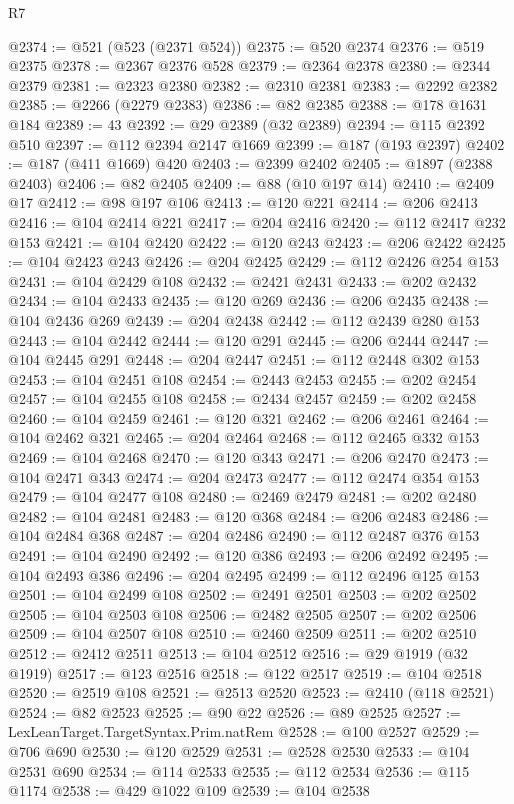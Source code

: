 \begin{lexlean}{R7}
\begin{coremodule}
@2374 := @521 (@523 (@2371 @524))
@2375 := @520 @2374
@2376 := @519 @2375
@2378 := @2367 @2376 @528
@2379 := @2364 @2378
@2380 := @2344 @2379
@2381 := @2323 @2380
@2382 := @2310 @2381
@2383 := @2292 @2382
@2385 := @2266 (@2279 @2383)
@2386 := @82 @2385
@2388 := @178 @1631 @184
@2389 := 43
@2392 := @29 @2389 (@32 @2389)
@2394 := @115 @2392 @510
@2397 := @112 @2394 @2147 @1669
@2399 := @187 (@193 @2397)
@2402 := @187 (@411 @1669) @420
@2403 := @2399 @2402
@2405 := @1897 (@2388 @2403)
@2406 := @82 @2405
@2409 := @88 (@10 @197 @14)
@2410 := @2409 @17
@2412 := @98 @197 @106
@2413 := @120 @221
@2414 := @206 @2413
@2416 := @104 @2414 @221
@2417 := @204 @2416
@2420 := @112 @2417 @232 @153
@2421 := @104 @2420
@2422 := @120 @243
@2423 := @206 @2422
@2425 := @104 @2423 @243
@2426 := @204 @2425
@2429 := @112 @2426 @254 @153
@2431 := @104 @2429 @108
@2432 := @2421 @2431
@2433 := @202 @2432
@2434 := @104 @2433
@2435 := @120 @269
@2436 := @206 @2435
@2438 := @104 @2436 @269
@2439 := @204 @2438
@2442 := @112 @2439 @280 @153
@2443 := @104 @2442
@2444 := @120 @291
@2445 := @206 @2444
@2447 := @104 @2445 @291
@2448 := @204 @2447
@2451 := @112 @2448 @302 @153
@2453 := @104 @2451 @108
@2454 := @2443 @2453
@2455 := @202 @2454
@2457 := @104 @2455 @108
@2458 := @2434 @2457
@2459 := @202 @2458
@2460 := @104 @2459
@2461 := @120 @321
@2462 := @206 @2461
@2464 := @104 @2462 @321
@2465 := @204 @2464
@2468 := @112 @2465 @332 @153
@2469 := @104 @2468
@2470 := @120 @343
@2471 := @206 @2470
@2473 := @104 @2471 @343
@2474 := @204 @2473
@2477 := @112 @2474 @354 @153
@2479 := @104 @2477 @108
@2480 := @2469 @2479
@2481 := @202 @2480
@2482 := @104 @2481
@2483 := @120 @368
@2484 := @206 @2483
@2486 := @104 @2484 @368
@2487 := @204 @2486
@2490 := @112 @2487 @376 @153
@2491 := @104 @2490
@2492 := @120 @386
@2493 := @206 @2492
@2495 := @104 @2493 @386
@2496 := @204 @2495
@2499 := @112 @2496 @125 @153
@2501 := @104 @2499 @108
@2502 := @2491 @2501
@2503 := @202 @2502
@2505 := @104 @2503 @108
@2506 := @2482 @2505
@2507 := @202 @2506
@2509 := @104 @2507 @108
@2510 := @2460 @2509
@2511 := @202 @2510
@2512 := @2412 @2511
@2513 := @104 @2512
@2516 := @29 @1919 (@32 @1919)
@2517 := @123 @2516
@2518 := @122 @2517
@2519 := @104 @2518
@2520 := @2519 @108
@2521 := @2513 @2520
@2523 := @2410 (@118 @2521)
@2524 := @82 @2523
@2525 := @90 @22
@2526 := @89 @2525
@2527 := LexLeanTarget.TargetSyntax.Prim.natRem
@2528 := @100 @2527
@2529 := @706 @690
@2530 := @120 @2529
@2531 := @2528 @2530
@2533 := @104 @2531 @690
@2534 := @114 @2533
@2535 := @112 @2534
@2536 := @115 @1174
@2538 := @429 @1022 @109
@2539 := @104 @2538

\end{coremodule}
\end{lexlean}

